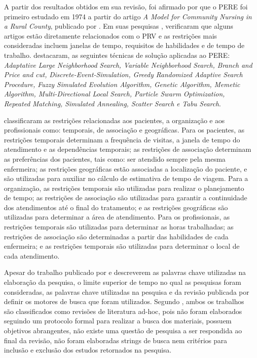 A partir dos resultados obtidos em sua revisão, foi afirmado por  que o \ac{PERE} foi primeiro estudado em 1974 a partir do artigo \textit{A Model for Community Nursing in a Rural County}, publicado por . Em suas pesquisas , verificaram  que alguns artigos estão diretamente relacionados com o \ac{PRV} e as restrições mais consideradas incluem janelas de tempo, requisitos de habilidades e de tempo de trabalho.
 destacaram, as seguintes técnicas de solução aplicadas ao \ac{PERE}: \textit{Adaptative Large Neighborhood Search, Variable Neighborhood Search, Branch and Price and cut, Discrete-Event-Simulation, Greedy Randomized Adaptive Search Procedure, Fuzzy Simulated Evolution Algorithm, Genetic Algorithm, Memetic Algorithm, Multi-Directional Local Search, Particle Swarm Optimization, Repeated Matching, Simulated Annealing, Scatter Search e Tabu Search}.

 classificaram as restrições relacionadas aos pacientes, a organização e aos profissionais como: temporais, de associação e geográficas. 
Para os pacientes, as restrições temporais determinam a frequência de visitas, a janela de tempo do atendimento e as dependências temporais; as restrições de associação determinam as preferências dos pacientes, tais como: ser atendido sempre pela mesma enfermeira; as restrições geográficas estão associadas a localização do paciente, e são utilizadas para auxiliar no cálculo de estimativa de tempo de viagem. 
Para a organização, as restrições temporais são utilizadas para realizar o planejamento de tempo; as restrições de associação são utilizadas para garantir a continuidade dos atendimentos até o final do tratamento; e as restrições geográficas são utilizadas para determinar a área de atendimento. 
Para os profissionais, as restrições temporais são utilizadas para determinar as horas trabalhadas; as restrições de associação são determinadas a partir das habilidades de cada enfermeira; e as restrições temporais são utilizadas para determinar o local de cada atendimento.

Apesar do trabalho publicado por  e  descreverem as palavras chave utilizadas na elaboração da pesquisa, o limite superior de tempo no qual as pesquisas foram consideradas, as palavras chave utilizadas na pesquisa e da revisão publicada por  definir os motores de busca que foram utilizados. 
Segundo , ambos os trabalhos são classificados como revisões de literatura ad-hoc, pois não foram elaborados seguindo um protocolo formal para realizar a busca dos materiais, possuem objetivos abrangentes, não existe uma questão de pesquisa a ser respondida ao final da revisão, não foram elaboradas strings de busca nem critérios para inclusão e exclusão dos estudos retornados na pesquisa. 


